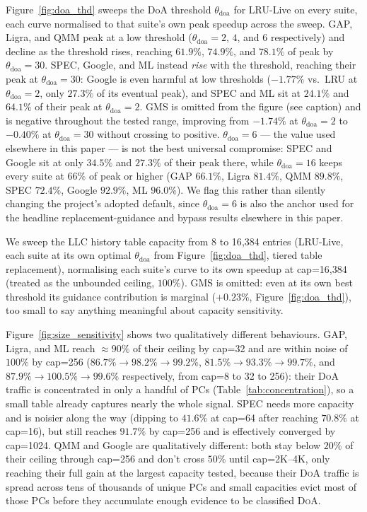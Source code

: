 \documentclass[conference]{IEEEtran}
\newcommand{\lru}{\textsc{LRU}\xspace}
\newcommand{\doa}{\textsc{DoA}\xspace}
\newcommand{\llc}{\textsc{LLC}\xspace}
\begin{document}
Figure~\ref{fig:doa_thd} sweeps the DoA threshold $\theta_{\mathrm{doa}}$ for
\lru-Live on every suite, each curve normalised to
that suite's own peak speedup across the sweep. GAP, Ligra, and QMM peak at
a low threshold ($\theta_{\mathrm{doa}}=2$, $4$, and $6$ respectively) and
decline as the threshold rises, reaching $61.9\%$, $74.9\%$, and $78.1\%$ of
peak by $\theta_{\mathrm{doa}}=30$. SPEC, Google, and ML instead \emph{rise}
with the threshold, reaching their peak at $\theta_{\mathrm{doa}}=30$: Google
is even harmful at low thresholds ($-1.77\%$ vs.\ \lru at
$\theta_{\mathrm{doa}}=2$, only $27.3\%$ of its eventual peak), and SPEC and
ML sit at $24.1\%$ and $64.1\%$ of their peak at $\theta_{\mathrm{doa}}=2$.
GMS is omitted from the figure (see caption) and is negative throughout the
tested range, improving from $-1.74\%$ at $\theta_{\mathrm{doa}}=2$ to
$-0.40\%$ at $\theta_{\mathrm{doa}}=30$ without crossing to positive.
$\theta_{\mathrm{doa}}=6$ --- the value used elsewhere in this paper --- is
not the best universal compromise: SPEC and Google sit
at only $34.5\%$ and $27.3\%$ of their peak there, while
$\theta_{\mathrm{doa}}=16$ keeps every suite at $66\%$ of peak or higher
(GAP $66.1\%$, Ligra $81.4\%$, QMM $89.8\%$, SPEC $72.4\%$, Google $92.9\%$,
ML $96.0\%$). We flag this rather than silently changing the project's
adopted default, since $\theta_{\mathrm{doa}}=6$ is also the anchor used for
the headline replacement-guidance and bypass results elsewhere in this
paper.

We sweep the \llc history table capacity from 8 to 16{,}384 entries
(\lru-Live, each suite at its own optimal $\theta_{\mathrm{doa}}$ from
Figure~\ref{fig:doa_thd}, tiered table replacement), normalising each suite's
curve to its own speedup at cap=16{,}384 (treated as the unbounded ceiling,
$100\%$). GMS is omitted: even at its own best threshold its guidance
contribution is marginal ($+0.23\%$, Figure~\ref{fig:doa_thd}), too small to
say anything meaningful about capacity sensitivity.

Figure~\ref{fig:size_sensitivity} shows two qualitatively different
behaviours. GAP, Ligra, and ML reach ${\approx}90\%$ of their ceiling by
cap=32 and are within noise of $100\%$ by cap=256 ($86.7\%\to98.2\%\to99.2\%$,
$81.5\%\to93.3\%\to99.7\%$, and $87.9\%\to100.5\%\to99.6\%$ respectively, from
cap=8 to 32 to 256): their \doa traffic is concentrated in only a handful of
PCs (Table~\ref{tab:concentration}), so a small table already captures nearly
the whole signal. SPEC needs more capacity and is noisier along the
way (dipping to $41.6\%$ at cap=64 after reaching $70.8\%$ at cap=16), but
still reaches $91.7\%$ by cap=256 and is effectively converged by cap=1024.
QMM and Google are qualitatively different: both stay below $20\%$ of their
ceiling through cap=256 and don't cross $50\%$ until cap=2K--4K, only
reaching their full gain at the largest capacity tested, because their \doa
traffic is spread across tens of thousands of unique PCs and small capacities
evict most of those PCs before they accumulate enough evidence to be
classified \doa.
\end{document}
